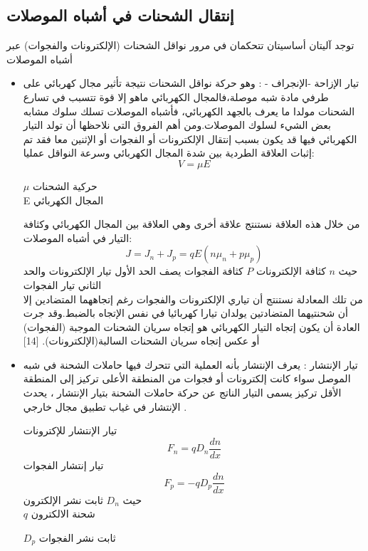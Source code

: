 	\subsection{إنتقال الشحنات في أشباه الموصلات}
	توجد آليتان أساسيتان تتحكمان في مرور نواقل الشحنات (الإلكترونات والفجوات) عبر أشباه الموصلات
	\begin{itemize}
		
		\item    تيار الإزاحة 
		-الإنجراف - 
		:
		وهو حركة نواقل الشحنات نتيجة تأثير مجال كهربائي على طرفي مادة شبه موصلة،فالمجال الكهربائي ماهو إلا قوة تتسبب في تسارع الشحنات مولدا ما يعرف بالجهد الكهربائي، فأشباه الموصلات تسلك سلوك مشابه بعض الشيء لسلوك الموصلات.ومن أهم الفروق التي نلاحظها أن تولد التيار الكهربائي فيها قد يكون بسبب إنتقال الإلكترونات أو الفجوات أو الإثنين معا
		فقد تم إثبات العلاقة الطردية بين شدة المجال الكهربائي وسرعة النواقل عمليا: 
		\begin {equation} 
		V= \mu E
		\end {equation}
		
		$\mu$ حركية الشحنات 
		\\
		E   المجال الكهربائي 
		
		من خلال هذه العلاقة  نستنتج علاقة أخرى وهي العلاقة بين المجال الكهربائي وكثافة التيار في أشباه الموصلات:
		\begin{equation} 
			J= J_n + J_p = q E (n \mu_ n + p \mu_ p )
		\end{equation}
		حيث $ n $  كثافة الإلكترونات 
		$ P $  كثافة الفجوات   
		يصف الحد الأول تيار الإلكترونات والحد الثاني تيار الفجوات
		\\  
		من تلك المعادلة نستنتج أن تياري الإلكترونات والفجوات رغم إتجاههما المتضادين إلا أن شحنتيهما المتضادتين يولدان تيارا كهربائيا في نفس الإتجاه بالضبط.وقد جرت العادة أن يكون إتجاه التيار الكهربائي هو إتجاه سريان الشحنات الموجبة (الفجوات) أو عكس إتجاه سريان الشحنات السالبة(الإلكترونات).
		[14]
		\item تيار الإنتشار  
		:
		يعرف الإنتشار بأنه العملية التي تتحرك فيها حاملات الشحنة في شبه الموصل سواء كانت إلكترونات أو فجوات من المنطقة الأعلى تركيز إلى المنطقة الأقل تركيز يسمى التيار الناتج عن حركة حاملات الشحنة بتيار الإنتشار ، يحدث الإنتشار في غياب تطبيق مجال خارجي .
		
	 \cite{a7}
		
		تيار الإنتشار للإكترونات 
		\begin {equation} 
		F_n = q D_n \frac{dn}{ dx}
		\end {equation}  
		تيار إنتشار الفجوات 
		\begin {equation}
		F_p =-q D_p \frac{dn}{ dx}
		\end {equation}
		حيث
		$ D_n  $   ثابت نشر الإلكترون
		\\
		$ q $  شحنة الالكترون 
		
		$ D_p $  ثابت نشر الفجوات
	\end{itemize}
